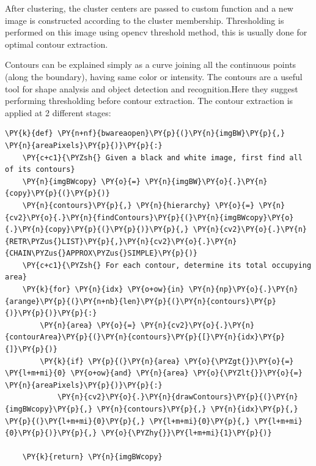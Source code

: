  After clustering, the cluster centers are passed to custom function and
a new image is constructed according to the cluster membership.
Thresholding is performed on this image using opencv threshold method,
this is usually done for optimal contour extraction.

{Contours} can be explained simply as a curve joining all the continuous
points (along the boundary), having same color or intensity. The
contours are a useful tool for shape analysis and object detection and
recognition.Here they suggest performing thresholding before contour
extraction. The contour extraction is applied at 2 different stages:

\begin{tcolorbox}[breakable, size=fbox, boxrule=1pt, pad at break*=1mm,colback=cellbackground, colframe=cellborder]
	\begin{Verbatim}[commandchars=\\\{\}]
\PY{k}{def} \PY{n+nf}{bwareaopen}\PY{p}{(}\PY{n}{imgBW}\PY{p}{,} \PY{n}{areaPixels}\PY{p}{)}\PY{p}{:}
    \PY{c+c1}{\PYZsh{} Given a black and white image, first find all of its contours}
    \PY{n}{imgBWcopy} \PY{o}{=} \PY{n}{imgBW}\PY{o}{.}\PY{n}{copy}\PY{p}{(}\PY{p}{)}
    \PY{n}{contours}\PY{p}{,} \PY{n}{hierarchy} \PY{o}{=} \PY{n}{cv2}\PY{o}{.}\PY{n}{findContours}\PY{p}{(}\PY{n}{imgBWcopy}\PY{o}{.}\PY{n}{copy}\PY{p}{(}\PY{p}{)}\PY{p}{,} \PY{n}{cv2}\PY{o}{.}\PY{n}{RETR\PYZus{}LIST}\PY{p}{,}\PY{n}{cv2}\PY{o}{.}\PY{n}{CHAIN\PYZus{}APPROX\PYZus{}SIMPLE}\PY{p}{)}
    \PY{c+c1}{\PYZsh{} For each contour, determine its total occupying area}
    \PY{k}{for} \PY{n}{idx} \PY{o+ow}{in} \PY{n}{np}\PY{o}{.}\PY{n}{arange}\PY{p}{(}\PY{n+nb}{len}\PY{p}{(}\PY{n}{contours}\PY{p}{)}\PY{p}{)}\PY{p}{:}
        \PY{n}{area} \PY{o}{=} \PY{n}{cv2}\PY{o}{.}\PY{n}{contourArea}\PY{p}{(}\PY{n}{contours}\PY{p}{[}\PY{n}{idx}\PY{p}{]}\PY{p}{)}
        \PY{k}{if} \PY{p}{(}\PY{n}{area} \PY{o}{\PYZgt{}}\PY{o}{=} \PY{l+m+mi}{0} \PY{o+ow}{and} \PY{n}{area} \PY{o}{\PYZlt{}}\PY{o}{=} \PY{n}{areaPixels}\PY{p}{)}\PY{p}{:}
            \PY{n}{cv2}\PY{o}{.}\PY{n}{drawContours}\PY{p}{(}\PY{n}{imgBWcopy}\PY{p}{,} \PY{n}{contours}\PY{p}{,} \PY{n}{idx}\PY{p}{,} \PY{p}{(}\PY{l+m+mi}{0}\PY{p}{,} \PY{l+m+mi}{0}\PY{p}{,} \PY{l+m+mi}{0}\PY{p}{)}\PY{p}{,} \PY{o}{\PYZhy{}}\PY{l+m+mi}{1}\PY{p}{)}

    \PY{k}{return} \PY{n}{imgBWcopy}
	\end{Verbatim}
\end{tcolorbox}

